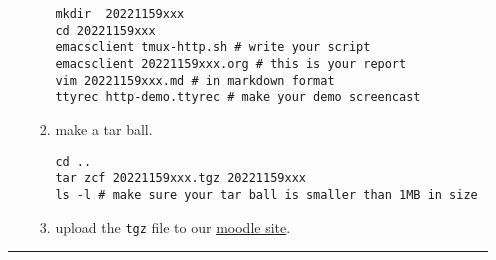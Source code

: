 \documentclass{article} [NO-DEFAULT-PACKAGES] \usepackage{wx672hyperref}
\begin{document}
\begin{itemize}
\begin{enumerate}
\begin{enumerate}
\begin{verbatim}
mkdir  20221159xxx
cd 20221159xxx
emacsclient tmux-http.sh # write your script
emacsclient 20221159xxx.org # this is your report
vim 20221159xxx.md # in markdown format
ttyrec http-demo.ttyrec # make your demo screencast
\end{verbatim}

\item make a tar ball.
\begin{verbatim}
cd ..
tar zcf 20221159xxx.tgz 20221159xxx
ls -l # make sure your tar ball is smaller than 1MB in size         
\end{verbatim}

\item upload the \texttt{tgz} file to our \href{https://cs6.swfu.edu.cn/moodle/mod/assign/view.php?id=536}{moodle site}.
\end{enumerate}
\end{enumerate}

\noindent\rule{\textwidth}{0.5pt}
\end{itemize}
\end{document}

